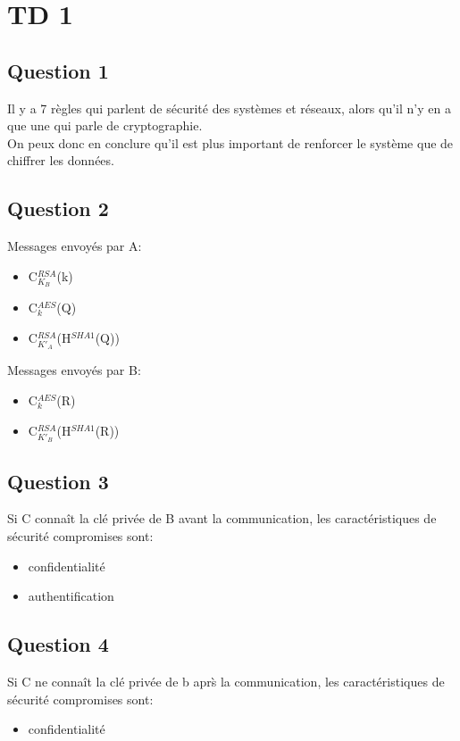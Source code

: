 \section{TD 1}
\subsection*{Question 1}
Il y a 7 r\`egles qui parlent de s\'ecurit\'e des syst\`emes et r\'eseaux, alors qu'il n'y en a que une qui parle de
cryptographie.\\
On peux donc en conclure qu'il est plus important de renforcer le syst\`eme que de chiffrer les donn\'ees.

\subsection*{Question 2}
Messages envoy\'es par A:
\begin{itemize}
  \item C$^{RSA}_{K_B}$(k)
  \item C$^{AES}_k$(Q)
  \item C$^{RSA}_{K'_A}$(H$^{SHA1}$(Q))
\end{itemize}

Messages envoy\'es par B:
\begin{itemize}
  \item C$^{AES}_k$(R)
  \item C$^{RSA}_{K'_B}$(H$^{SHA1}$(R))
\end{itemize}

\subsection*{Question 3}
Si C conna\^it la cl\'e priv\'ee de B avant la communication, les caract\'eristiques de s\'ecurit\'e compromises sont:
\begin{itemize}
  \item confidentialit\'e
  \item authentification
\end{itemize}

\subsection*{Question 4}
Si C ne conna\^it la cl\'e priv\'ee de b apr\`s la communication, les caract\'eristiques de s\'ecurit\'e compromises
sont:
\begin{itemize}
  \item confidentialit\'e
\end{itemize}
